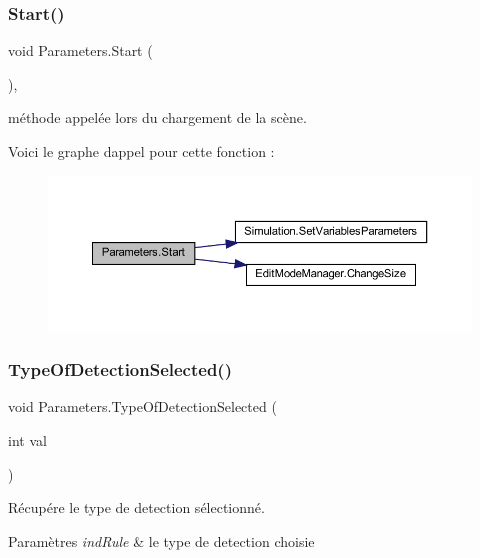 \subsubsection{\texorpdfstring{Start()}{Start()}}
{\footnotesize\ttfamily void Parameters.\+Start (\begin{DoxyParamCaption}{ }\end{DoxyParamCaption})\hspace{0.3cm}{\ttfamily [inline]}, {\ttfamily [private]}}



méthode appelée lors du chargement de la scène. 

Voici le graphe d\textquotesingle{}appel pour cette fonction \+:
\nopagebreak
\begin{figure}[H]
\begin{center}
\leavevmode
\includegraphics[width=350pt]{class_parameters_aa31bc8929b4008944bd7f720bfac9a62_cgraph}
\end{center}
\end{figure}
\mbox{\label{class_parameters_aea7e3963fed0681d7a9f756a5deb52d1}} 
\subsubsection{\texorpdfstring{Type\+Of\+Detection\+Selected()}{TypeOfDetectionSelected()}}
{\footnotesize\ttfamily void Parameters.\+Type\+Of\+Detection\+Selected (\begin{DoxyParamCaption}\item[{int}]{val }\end{DoxyParamCaption})\hspace{0.3cm}{\ttfamily [inline]}}



Récupére le type de detection sélectionné. 


\begin{DoxyParams}{Paramètres}
{\em ind\+Rule} & le type de detection choisie\\
\hline
\end{DoxyParams}
\mbox{\label{class_parameters_a92f68fa9992b1066153a6175dd37dc36}} 
